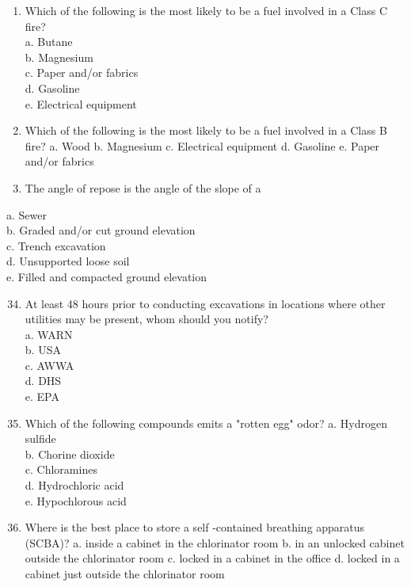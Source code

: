 \documentclass[10pt]{article}
\begin{document}
\begin{enumerate}
\begin{enumerate}
\begin{enumerate}
  \item Which of the following is the most likely to be a fuel involved in a Class C fire?\\
a. Butane\\
b. Magnesium\\
c. Paper and/or fabrics\\
d. Gasoline\\
e. Electrical equipment

  \item Which of the following is the most likely to be a fuel involved in a Class B fire?
a. Wood
b. Magnesium
c. Electrical equipment
d. Gasoline
e. Paper and/or fabrics

  \item The angle of repose is the angle of the slope of a

\end{enumerate}

a. Sewer\\
b. Graded and/or cut ground elevation\\
c. Trench excavation\\
d. Unsupported loose soil\\
e. Filled and compacted ground elevation\\

\begin{enumerate}
  \setcounter{enumi}{33}
  \item At least 48 hours prior to conducting excavations in locations where other utilities may be present, whom should you notify?\\
a. WARN\\
b. USA\\
c. AWWA\\
d. DHS\\
e. EPA

  \item Which of the following compounds emits a "rotten egg" odor?
a. Hydrogen sulfide\\
b. Chorine dioxide\\
c. Chloramines\\
d. Hydrochloric acid\\
e. Hypochlorous acid\\

  \item Where is the best place to store a self -contained breathing apparatus (SCBA)?
a. inside a cabinet in the chlorinator room
b. in an unlocked cabinet outside the chlorinator room
c. locked in a cabinet in the office
d. locked in a cabinet just outside the chlorinator room


\end{enumerate}
\end{enumerate}
\end{enumerate}
\end{document}
